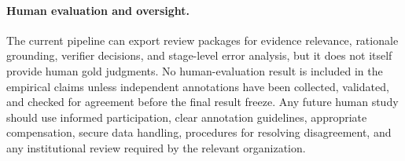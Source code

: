 \paragraph{Human evaluation and oversight.}
The current pipeline can export review packages for evidence relevance,
rationale grounding, verifier decisions, and stage-level error analysis,
but it does not itself provide human gold judgments.
No human-evaluation result is included in the empirical claims unless
independent annotations have been collected, validated, and checked for
agreement before the final result freeze.
Any future human study should use informed participation, clear annotation
guidelines, appropriate compensation, secure data handling, procedures for
resolving disagreement, and any institutional review required by the
relevant organization.